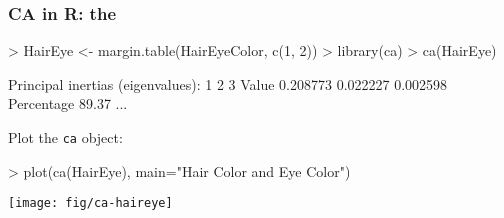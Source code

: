 \renewcommand{\FileName}{ca-R}

\begin{frame}[fragile]
	\frametitle{CA in R: the }

\begin{Rin}[baselinestretch=0.8,fontsize=\footnotesize]
> HairEye <- margin.table(HairEyeColor, c(1, 2))
> library(ca)
> ca(HairEye)
\end{Rin}
\begin{Rout}[baselinestretch=0.8,fontsize=\footnotesize]
 Principal inertias (eigenvalues):
           1        2        3       
Value      0.208773 0.022227 0.002598
Percentage 89.37%
 ...
\end{Rout}
Plot the \texttt{ca} object:
\begin{Rin}
> plot(ca(HairEye), main="Hair Color and Eye Color")
\end{Rin}

\begin{center}
\texttt{[image: fig/ca-haireye]}
\end{center}
\end{frame}